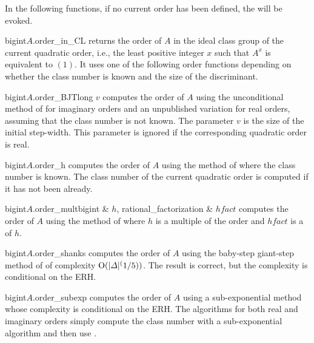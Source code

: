 

In the following functions, if no current order has been defined, the \LEH will be evoked.

\begin{cfcode}{bigint}{$A$.order_in_CL}{}
  returns the order of $A$ in the ideal class group of the current quadratic order, i.e., the
  least positive integer $x$ such that $A^x$ is equivalent to $(1)$.  It uses one of the
  following order functions depending on whether the class number is known and the size of the
  discriminant.
\end{cfcode}

\begin{cfcode}{bigint}{$A$.order_BJT}{long $v$}
  computes the order of $A$ using the unconditional method of
  \cite{Buchmann/Jabobson/Teske:1997} for imaginary orders and an unpublished variation for real
  orders, assuming that the class number is not known.  The parameter $v$ is the size of the
  initial step-width.  This parameter is ignored if the corresponding quadratic order is real.
\end{cfcode}

\begin{cfcode}{bigint}{$A$.order_h}{}
  computes the order of $A$ using the method of \cite{Shanks:1971} where the class number is
  known.  The class number of the current quadratic order is computed if it has not been
  already.
\end{cfcode}

\begin{cfcode}{bigint}{$A$.order_mult}{bigint & $h$, rational_factorization & $\mathit{hfact}$}
  computes the order of $A$ using the method of \cite{Shanks:1971} where $h$ is a multiple of
  the order and $\mathit{hfact}$ is a  of $h$.
\end{cfcode}

\begin{cfcode}{bigint}{$A$.order_shanks}{}
  computes the order of $A$ using the baby-step giant-step method of \cite{Shanks:1971} of
  complexity $\mathrm{O}(|\varDelta|^(1/5))$.  The result is correct, but the complexity is conditional
  on the ERH.
\end{cfcode}

\begin{cfcode}{bigint}{$A$.order_subexp}{}
  computes the order of $A$ using a sub-exponential method whose complexity is conditional on
  the ERH.  The algorithms for both real and imaginary orders simply compute the class number
  with a sub-exponential algorithm and then use .
\end{cfcode}

